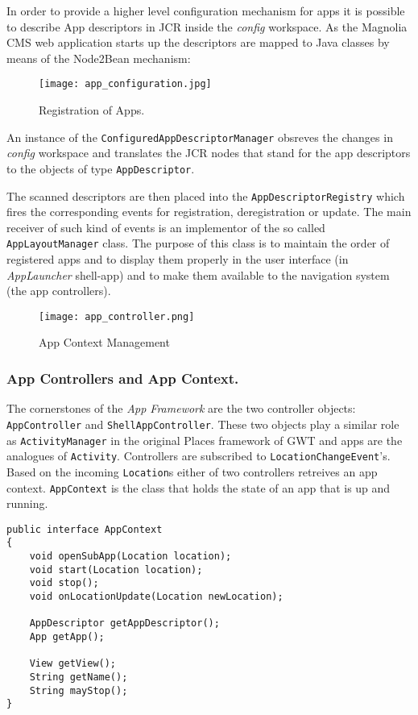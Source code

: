 In order to provide a higher level configuration mechanism for apps it is
possible to describe App descriptors in JCR inside the \emph{config} workspace.
As the Magnolia CMS web application starts up the descriptors are mapped to Java
classes by means of the Node2Bean mechanism:

\begin{figure}[H] \centering \texttt{[image: app\_configuration.jpg]}
	\caption{Registration of Apps.}
	\label{fig:app_registry}
\end{figure}

An instance of the \texttt{ConfiguredAppDescriptorManager} obsreves the changes 
in \emph{config} workspace and translates the JCR nodes that stand for the app descriptors to 
the objects of type \texttt{AppDescriptor}.

The scanned descriptors are then placed into the \texttt{AppDescriptorRegistry}
which fires the corresponding events for registration, deregistration or update.
The main receiver of such kind of events is an implementor of the so called
\texttt{AppLayoutManager} class. The purpose of this class is to maintain the
order of registered apps and to display them properly in the user interface (in
\emph{AppLauncher} shell-app) and to make them available to the navigation
system (the app controllers).

\begin{figure}[H] \centering \texttt{[image: app\_controller.png]}
	\caption{App Context Management}
	\label{fig:app_context}
\end{figure}

\subsubsection{App Controllers and App Context.} The cornerstones of the \emph{App Framework} are the two
controller objects: \texttt{AppController} and \texttt{ShellAppController}.
These two objects play a similar role as \texttt{ActivityManager} in the original 
Places framework of GWT and apps are the analogues of \texttt{Activity}.
Controllers are subscribed to \texttt{LocationChangeEvent}'s. Based on the
incoming \texttt{Location}s either of two controllers retreives an app context.
\texttt{AppContext} is the class that holds the state of an app that is up and
running.

\begin{lstlisting}
public interface AppContext 
{
    void openSubApp(Location location);
    void start(Location location);
    void stop();
    void onLocationUpdate(Location newLocation);
    
    AppDescriptor getAppDescriptor();
    App getApp();
    
    View getView();
    String getName();    
    String mayStop();
}
\end{lstlisting}

